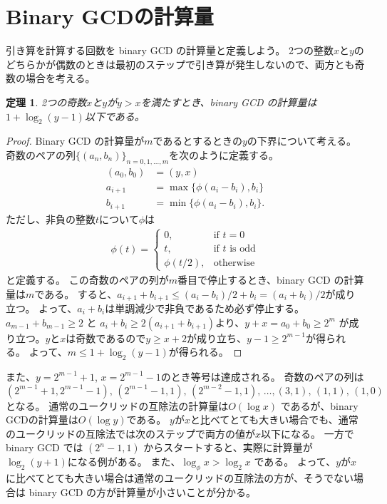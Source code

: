 \documentclass[a4paper,oneside,onecolumn,openany,article,10pt]{memoir}
\newtheorem{theorem}{定理}
\theoremstyle{remark}
\begin{document}
\section{Binary GCDの計算量}
引き算を計算する回数を binary GCD の計算量と定義しよう。
2つの整数$x$と$y$のどちらかが偶数のときは最初のステップで引き算が発生しないので、両方とも奇数の場合を考える。
\begin{theorem}
2つの奇数$x$と$y$が$y>x$を満たすとき、binary GCD の計算量は$1+\log_2(y-1)$以下である。
\end{theorem}
\begin{proof}
Binary GCD の計算量が$m$であるとするときの$y$の下界について考える。
奇数のペアの列$\{(a_n, b_n)\}_{n=0,1,\dotsc,m}$を次のように定義する。
\begin{align*}
(a_0, b_0) &= (y, x)\\
a_{i+1} &= \max\{\phi(a_{i}-b_{i}), b_i\}\\
b_{i+1} &= \min\{\phi(a_{i}-b_{i}), b_i\}.
\end{align*}
ただし、非負の整数$t$について$\phi$は
\begin{align*}
\phi(t)=\begin{cases}
0,&\text{if } t = 0\\
t,&\text{if $t$ is odd}\\
\phi(t/2),&\text{otherwise}
\end{cases}
\end{align*}
と定義する。
この奇数のペアの列が$m$番目で停止するとき、binary GCD の計算量は$m$である。
すると、$a_{i+1}+b_{i+1} \le (a_i-b_i)/2 + b_i = (a_i+b_i)/2$が成り立つ。
よって、$a_i+b_i$は単調減少で非負であるため必ず停止する。
$a_{m-1}+b_{m-1}\ge 2$ と $a_i+b_i\ge 2(a_{i+1}+b_{i+1})$より、$y+x=a_0+b_0\ge 2^{m}$
が成り立つ。$y$と$x$は奇数であるので$y\ge x+2$が成り立ち、$y-1\ge 2^{m-1}$が得られる。
よって、$m\le 1+\log_2(y-1)$が得られる。
\end{proof}
また、$y=2^{m-1}+1$, $x=2^{m-1}-1$のとき等号は達成される。
奇数のペアの列は
$(2^{m-1}+1, 2^{m-1}-1),\, (2^{m-1}-1, 1),\, (2^{m-2}-1, 1),\, \dotsc, (3,1),\, (1,1),\, (1,0)$
となる。
通常のユークリッドの互除法の計算量は$O(\log x)$ であるが、binary GCDの計算量は$O(\log y)$である。
$y$が$x$と比べてとても大きい場合でも、通常のユークリッドの互除法では次のステップで両方の値が$x$以下になる。
一方で binary GCD では $(2^n-1, 1)$ からスタートすると、実際に計算量が$\log_2 (y+1)$になる例がある。
また、$\log_\phi x > \log_2 x$ である。
よって、$y$が$x$に比べてとても大きい場合は通常のユークリッドの互除法の方が、そうでない場合は binary GCD の方が計算量が小さいことが分かる。
\end{document}
